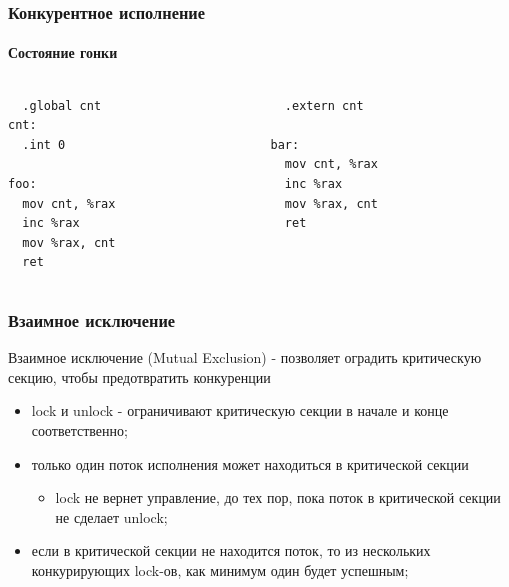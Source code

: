 \begin{frame}[fragile]
\frametitle{Конкурентное исполнение}
\framesubtitle{Состояние гонки}

\begin{columns}[T]
  \begin{column}{.45\linewidth}
    \begin{lstlisting}
  .global cnt
cnt:
  .int 0

foo:
  mov cnt, %rax
  inc %rax
  mov %rax, cnt
  ret
    \end{lstlisting}
  \end{column}
  \begin{column}{.45\linewidth}
    \begin{lstlisting}
  .extern cnt

bar:
  mov cnt, %rax
  inc %rax
  mov %rax, cnt
  ret
    \end{lstlisting}
  \end{column}
\end{columns}
\end{frame}

\begin{frame}
\frametitle{Взаимное исключение}

Взаимное исключение (Mutual Exclusion) - позволяет оградить критическую секцию,
чтобы предотвратить конкуренции

\begin{itemize}
  \item lock и unlock - ограничивают критическую секции в начале и конце
        соответственно;
  \item только один поток исполнения может находиться в критической секции
        \begin{itemize}
          \item lock не вернет управление, до тех пор, пока поток в критической
                секции не сделает unlock;
        \end{itemize}
  \item если в критической секции не находится поток, то из нескольких
        конкурирующих lock-ов, как минимум один будет успешным;
\end{itemize}
\end{frame}

